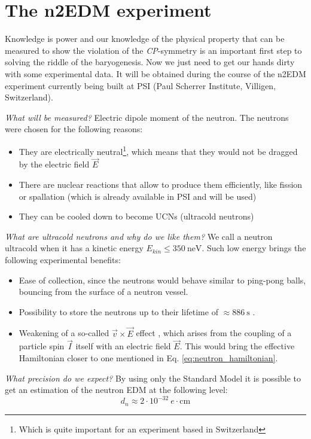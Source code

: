 \chapter{The n2EDM experiment}
\label{chapter:experiment}

Knowledge is power and our knowledge of the physical property that can be measured to show the violation of the \textit{CP}-symmetry is an important first step to solving the riddle of the baryogenesis. Now we just need to get our hands dirty with some experimental data. It will be obtained during the course of the n2EDM experiment currently being built at PSI (Paul Scherrer Institute, Villigen, Switzerland).

\textit{What will be measured?} Electric dipole moment of the neutron. The neutrons were chosen for the following reasons:
\begin{itemize}
	\item They are electrically neutral\footnote{Which is quite important for an experiment based in Switzerland}, which means that they would not be dragged by the electric field $\vec{E}$
	\item There are nuclear reactions that allow to produce them efficiently, like fission or spallation (which is already available in PSI and will be used)
	\item They can be cooled down to become UCNs (ultracold neutrons)
\end{itemize}

\textit{What are ultracold neutrons and why do we like them?} We call a neutron ultracold when it has a kinetic energy $E_{kin} \leq 350\ \text{neV}$. Such low energy brings the following experimental benefits:
\begin{itemize}
	\item Ease of collection, since the neutrons would behave similar to ping-pong balls, bouncing from the surface of a neutron vessel.
	\item Possibility to store the neutrons up to their lifetime of $\approx 886\ \text{s}$ \cite{Tanabashi2018}.
	\item Weakening of a so-called $\vec{v} \times \vec{E}$ effect \cite{Pendlebury2004}, which arises from the coupling of a particle spin $\vec{I}$ itself with an electric field $\vec{E}$. This would bring the effective Hamiltonian closer to one mentioned in Eq. \ref{eq:neutron_hamiltonian}.
\end{itemize}

\textit{What precision do we expect?} By using only the Standard Model it is possible to get an estimation \cite{Khriplovich1982} of the neutron EDM at the following level:
\begin{equation}
	d_n \approx 2 \cdot 10^{-32}\ e \cdot \text{cm}
\end{equation}

